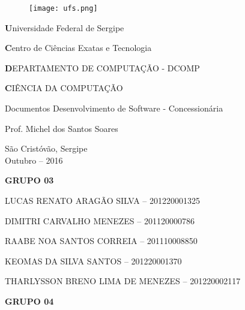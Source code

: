 \begin{titlepage}

\newcommand{\universidade}{Universidade Federal de Sergipe}
\newcommand{\centro}{Centro de Ciências Exatas e Tecnologia}
\newcommand{\departamento}{DEPARTAMENTO DE COMPUTAÇÃO - DCOMP}
\newcommand{\curso}{CIÊNCIA DA COMPUTAÇÃO}

\newcommand{\titulo}{Documentos Desenvolvimento de Software - Concessionária}

\newcommand{\professor}{Prof. Michel dos Santos Soares }

\begin{center}
\begin{figure}[t]
	\centering
	\texttt{[image: ufs.png]}
\end{figure}
{\large \textbf \universidade}
\par
{\large \textbf \centro}
\par
{\large \textbf \departamento}
\par
{\large \textbf \curso}
\par
\vspace{60pt}

{\large \titulo}
\par
\vspace{60pt}

{\large \professor}
\par
\vfill

{\large São Cristóvão, Sergipe}\\
{\large Outubro -- 2016}
\end{center}
\end{titlepage}



\newcommand{\alunoA}{LUCAS RENATO ARAGÃO SILVA -- 201220001325}
\newcommand{\alunoB}{DIMITRI CARVALHO MENEZES -- 201120000786}
\newcommand{\alunoC}{RAABE NOA SANTOS CORREIA -- 201110008850}
\newcommand{\alunoD}{KEOMAS DA SILVA SANTOS -- 201220001370}
\newcommand{\alunoE}{THARLYSSON BRENO LIMA DE MENEZES -- 201220002117}

\setcounter{page}{2}

\begin{center}

{\large \textbf {GRUPO 03}}
\par
\vspace{12pt}
{\normalsize \alunoA}
\par
{\normalsize \alunoB}
\par
{\normalsize \alunoC}
\par
{\normalsize \alunoD}
\par
{\normalsize \alunoE}
\par
\vspace{12pt}
{\large \textbf {GRUPO 04}}
\par

\end{center}
\clearpage



\renewcommand{\contentsname}{Conteúdo}
{
	\hypersetup{linkcolor=black}
	\tableofcontents
}
